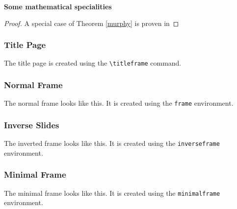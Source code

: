 \documentclass{beamer}
\begin{document}
\begin{frame}
\textbf{Some mathematical specialities}


\begin{proof}
  A special case of Theorem \ref{murphy} is proven in %
\end{proof}
\end{frame}

\begin{frame}
\frametitle{Title Page}
The title page is created using the \texttt{\textbackslash titleframe} command.
\end{frame}

\begin{frame}
\frametitle{Normal Frame}
The normal frame looks like this. It is created using the \texttt{frame} environment.
\end{frame}

\begin{inverseframe}
  \frametitle{Inverse Slides}
The inverted frame looks like this. It is created using the \texttt{inverseframe} environment.
 
\end{inverseframe}

\begin{minimalframe}
  \frametitle{Minimal Frame}
The minimal frame looks like this. It is created using the \texttt{minimalframe} environment.
  
\end{minimalframe}
\end{document}
